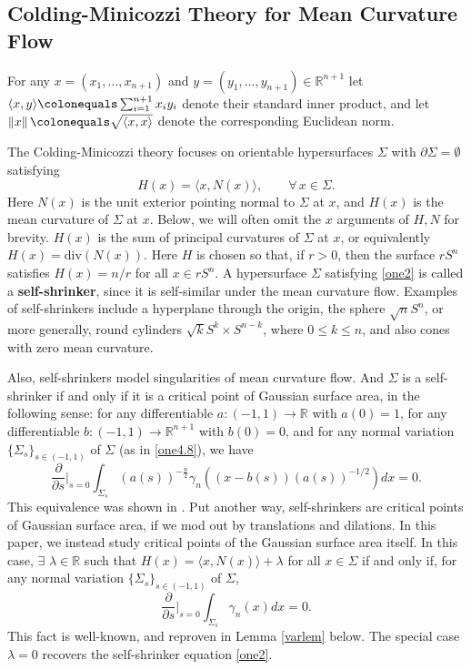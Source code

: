 \documentclass[12pt,reqno]{amsart}
\theoremstyle{definition}
\newcommand{\vnormt}[1]{\left\|#1\right\|}    %
\newcommand{\R}{\mathbb{R}}
\newcommand{\embolden}[1]{\textbf {#1}}
\newcommand{\sdimn}{n}
\newcommand{\adimn}{n+1}
\newcommand{\scon}{\lambda}
\begin{document}
\subsection{Colding-Minicozzi Theory for Mean Curvature Flow}

 For any $x=(x_1,\ldots,x_{\adimn})$ and $y=(y_1,\ldots,y_{\adimn})\in \R^{\adimn}$ let $\langle x,y\rangle \colonequals\sum_{i=1}^{\adimn} x_{i} y_{i}$ denote their standard inner product, and let $\vnormt{x}\colonequals\sqrt{\langle x,x\rangle}$ denote the corresponding Euclidean norm.

The Colding-Minicozzi theory \cite{colding12a,colding12} focuses on orientable hypersurfaces $\Sigma$ with $\partial\Sigma=\emptyset$ satisfying
\begin{equation}\label{one2}
H(x)=\langle x, N(x)\rangle,\qquad\forall\,x\in\Sigma.
\end{equation}
Here $N(x)$ is the unit exterior pointing normal to $\Sigma$ at $x$, and $H(x)$ is the mean curvature of $\Sigma$ at $x$.  Below, we will often omit the $x$ arguments of $H,N$ for brevity.  $H(x)$ is the sum of principal curvatures of $\Sigma$ at $x$, or equivalently $H(x)=\mathrm{div}(N(x))$.
Here $H$ is chosen so that, if $r>0$, then the surface $r S^{\sdimn}$ satisfies $H(x)=n/r$ for all $x\in r S^{\sdimn}$.  A hypersurface $\Sigma$ satisfying \eqref{one2} is called a \embolden{self-shrinker}, since it is self-similar under the mean curvature flow.  Examples of self-shrinkers include a hyperplane through the origin, the sphere $\sqrt{\sdimn}S^{\sdimn}$, or more generally, round cylinders $\sqrt{k} S^{k}\times S^{\sdimn -k}$, where $0\leq k\leq n$, and also cones with zero mean curvature.

Also, self-shrinkers model singularities of mean curvature flow.  And $\Sigma$ is a self-shrinker if and only if it is a critical point of Gaussian surface area, in the following sense: for any differentiable $a\colon(-1,1)\to\R$ with $a(0)=1$, for any differentiable $b\colon(-1,1)\to\R^{\adimn}$ with $b(0)=0$, and for any normal variation $\{\Sigma_{s}\}_{s\in(-1,1)}$ of $\Sigma$ (as in \eqref{one4.8}), we have
$$\frac{\partial}{\partial s}\Big|_{s=0}\int_{\Sigma_{s}}(a(s))^{-\frac{\sdimn}{2}}\gamma_{\sdimn}((x-b(s))(a(s))^{-1/2})dx=0.$$
This equivalence was shown in \cite[Proposition 3.6]{colding12a}.  Put another way, self-shrinkers are critical points of Gaussian surface area, if we mod out by translations and dilations.  In this paper, we instead study critical points of the Gaussian surface area itself.  In this case, $\exists$ $\scon\in\R$ such that $H(x)=\langle x,N(x)\rangle+\scon$ for all $x\in\Sigma$ if and only if, for any normal variation $\{\Sigma_{s}\}_{s\in(-1,1)}$ of $\Sigma$,
$$\frac{\partial}{\partial s}\Big|_{s=0}\int_{\Sigma_{s}}\gamma_{\sdimn}(x)dx=0.$$
This fact is well-known, and reproven in Lemma \ref{varlem} below.  The special case $\scon=0$ recovers the self-shrinker equation \eqref{one2}.
\end{document}
